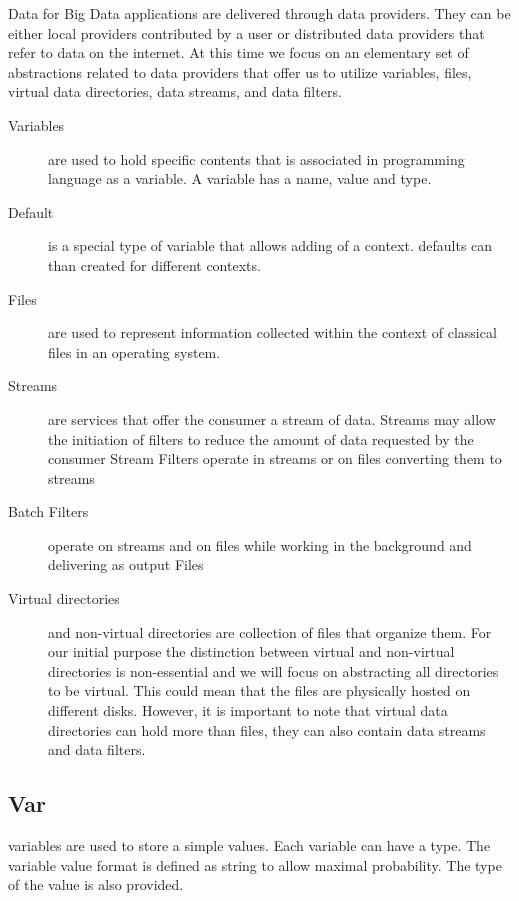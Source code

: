 \documentclass[9pt,twocolumn,twoside]{styles/osajnl}
\begin{document}
Data for Big Data applications are delivered through data
providers. They can be either local providers contributed by a user or
distributed data providers that refer to data on the internet. At this
time we focus on an elementary set of abstractions related to data
providers that offer us to utilize variables, files, virtual data
directories, data streams, and data filters.

\begin{description}
\item[Variables] are used to hold specific contents that is associated
  in programming language as a variable. A variable has a name, value
  and type.

\item[Default] is a special type of variable that allows adding of a
  context. defaults can than created for different contexts.

\item[Files] are used to represent information collected within the context
of classical files in an operating system. 

\item[Streams] are services that offer the consumer a stream of data. Streams may allow the initiation of filters to reduce the amount of data requested by the consumer 
Stream Filters operate in streams or on files converting them to streams 

\item[Batch Filters] operate on streams and on files while working in
  the background and delivering as output Files 

\item[Virtual directories] and non-virtual directories are collection
  of files that organize them. For our initial purpose the distinction
  between virtual and non-virtual directories is non-essential and we
  will focus on abstracting all directories to be virtual. This could
  mean that the files are physically hosted on different
  disks. However, it is important to note that virtual data
  directories can hold more than files, they can also contain data
  streams and data filters.

\end{description}

\subsection{Var}

variables are used to store a simple values. Each variable can have a
type. The variable value format is defined as string to allow maximal
probability. The type of the value is also provided.
\end{document}
